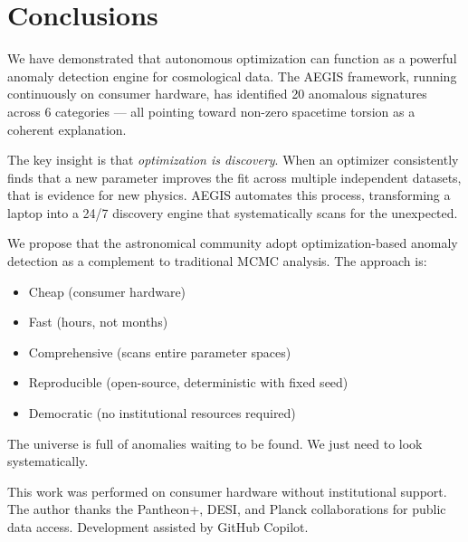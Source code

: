 \documentclass[twocolumn,showpacs,preprintnumbers,amsmath,amssymb,prl]{revtex4-2}
\begin{document}
\section{Conclusions}

We have demonstrated that autonomous optimization can function as a powerful anomaly detection engine for cosmological data. The AEGIS framework, running continuously on consumer hardware, has identified 20 anomalous signatures across 6 categories --- all pointing toward non-zero spacetime torsion as a coherent explanation.

The key insight is that \textit{optimization is discovery}. When an optimizer consistently finds that a new parameter improves the fit across multiple independent datasets, that is evidence for new physics. AEGIS automates this process, transforming a laptop into a 24/7 discovery engine that systematically scans for the unexpected.

We propose that the astronomical community adopt optimization-based anomaly detection as a complement to traditional MCMC analysis. The approach is:
\begin{itemize}
\item Cheap (consumer hardware)
\item Fast (hours, not months)
\item Comprehensive (scans entire parameter spaces)
\item Reproducible (open-source, deterministic with fixed seed)
\item Democratic (no institutional resources required)
\end{itemize}

The universe is full of anomalies waiting to be found. We just need to look systematically.

\begin{acknowledgments}
This work was performed on consumer hardware without institutional support. The author thanks the Pantheon+, DESI, and Planck collaborations for public data access. Development assisted by GitHub Copilot.
\end{acknowledgments}
\end{document}
